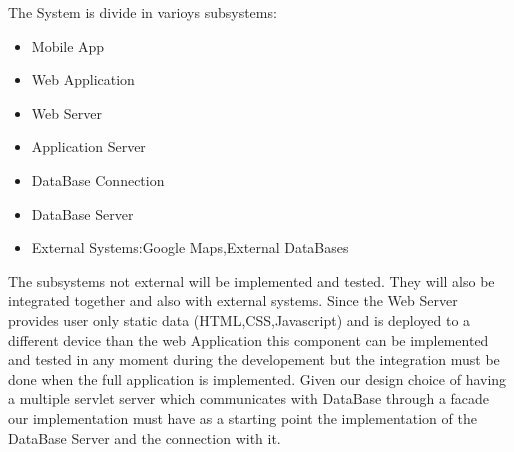 
The System is divide in varioys subsystems:
\begin{itemize}
\item Mobile App
\item Web Application
\item Web Server
\item Application Server
\item DataBase Connection
\item DataBase Server 
\item External Systems:Google Maps,External DataBases
\end{itemize}
The subsystems not external will be implemented and tested. They will also be integrated together and also with external systems.
Since the Web Server provides user only static data (HTML,CSS,Javascript) and is deployed to a different device than the web Application this component can be implemented and tested in any moment during the developement but the integration must be done when the full application is implemented. 
Given our design choice of having a multiple servlet server which communicates with DataBase through a facade our implementation must have as a starting point the implementation of the DataBase Server and the connection with it.
